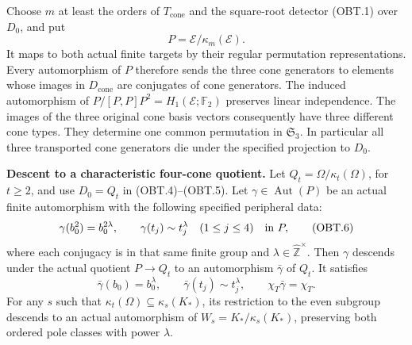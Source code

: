 Choose $m$ at least the orders of $T_{\mathrm{cone}}$ and
the square-root detector (OBT.1) over $D_0$, and put
\[
                 P=\mathcal E/\kappa_m(\mathcal E).
                                                               \tag{OBT.5}
\]
It maps to both actual finite targets by their regular
permutation representations.  Every automorphism of $P$
therefore sends the three cone generators to elements whose
images in $D_{\mathrm{cone}}$ are conjugates of cone
generators.  The induced automorphism of
$P/[P,P]P^2=H_1(\mathcal E;\mathbb F_2)$ preserves linear
independence.  The images of the three original cone basis
vectors consequently have three different cone types.
They determine one common permutation in $\mathfrak S_3$.
In particular all three transported cone generators die
under the specified projection to $D_0$.

\par\medskip\noindent\textbf{Descent to a characteristic four-cone quotient.}\quad
Let
$Q_t=\Omega/\kappa_t(\Omega)$, for $t\geq2$, and use
$D_0=Q_t$ in (OBT.4)--(OBT.5).
Let $\gamma\in\operatorname{Aut}(P)$ be an actual finite
automorphism with the following specified peripheral data:
\[
 \gamma(b_0^2)=b_0^{2\lambda},\qquad
 \gamma(t_j)\sim t_j^\lambda\quad(1\leq j\leq4)
                           \quad\hbox{in }P,
                                                               \tag{OBT.6}
\]
where each conjugacy is in that same finite group and
$\lambda\in\widehat{\mathbb Z}^{\times}$.
Then $\gamma$ descends under the actual quotient $P\to Q_t$
to an automorphism $\bar\gamma$ of $Q_t$.  It satisfies
\[
 \bar\gamma(b_0)=b_0^\lambda,\qquad
 \bar\gamma(t_j)\sim t_j^\lambda,
 \qquad\chi_T\bar\gamma=\chi_T.
                                                               \tag{OBT.7}
\]
For any $s$ such that
$\kappa_t(\Omega)\subseteq\kappa_s(K_*)$, its restriction
to the even subgroup descends to an actual automorphism of
$W_s=K_*/\kappa_s(K_*)$, preserving both ordered pole
classes with power $\lambda$.


